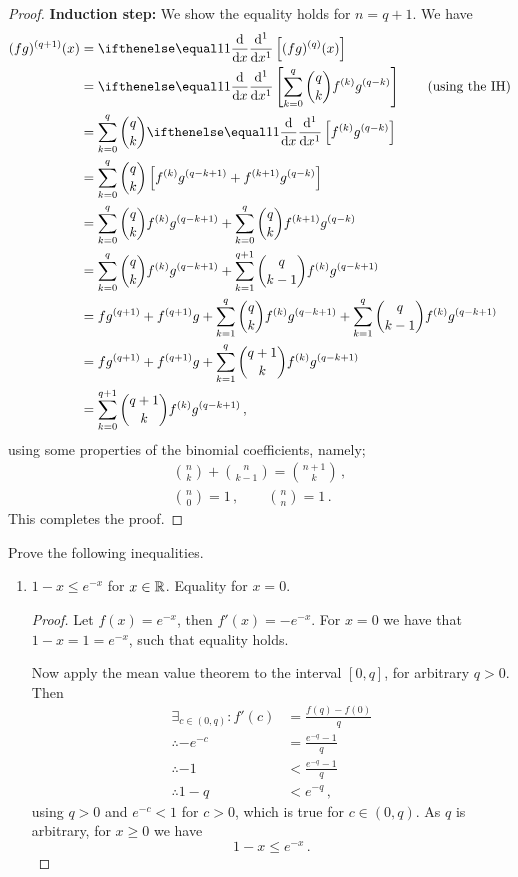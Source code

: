 \documentclass[week=6]{homework}
\begin{document}
\begin{questions}
\begin{proof}
	    	\textbf{Induction step:}
	    	We show the equality holds for $n=q+1$. We have
	    	\begin{align*}
		    	(fg)^{(q+1)}(x) &= \diff{}\left[ (fg)^{(q)}(x) \right] \\
		    	&= \diff{} \left[ \sum_{k=0}^{q} {q\choose k} f^{(k)}g^{(q-k)} \right] \qquad \mbox{(using the IH)} \\
		    	&= \sum_{k=0}^{q} {q\choose k} \diff{} \left[ f^{(k)}g^{(q-k)} \right] \\
		    	&= \sum_{k=0}^{q} {q\choose k} \left[f^{(k)}g^{(q-k+1)} + f^{(k+1)}g^{(q-k)}\right] \\
		    	&= \sum_{k=0}^{q} {q\choose k} f^{(k)}g^{(q-k+1)} + \sum_{k=0}^{q} {q\choose k} f^{(k+1)}g^{(q-k)} \\
		    	&= \sum_{k=0}^{q} {q\choose k} f^{(k)}g^{(q-k+1)} + \sum_{k=1}^{q+1} {q\choose k-1} f^{(k)}g^{(q-k+1)} \\
		    	&= fg^{(q+1)} + f^{(q+1)}g + \sum_{k=1}^{q} {q\choose k} f^{(k)}g^{(q-k+1)} + \sum_{k=1}^{q} {q\choose k-1} f^{(k)}g^{(q-k+1)} \\
		    	&= fg^{(q+1)} + f^{(q+1)}g + \sum_{k=1}^{q} {q+ 1 \choose k} f^{(k)}g^{(q-k+1)} \\
		    	&= \sum_{k=0}^{q+1} {q+ 1 \choose k} f^{(k)}g^{(q-k+1)}\,,
	    	\end{align*}
	    	using some properties of the binomial coefficients, namely;
	    	\begin{gather*}
	    		{n \choose k} + {n \choose k-1} = {n+1 \choose k} \,, \\
	    		{n \choose 0} = 1 \,, \qquad {n \choose n} = 1\,.
	    	\end{gather*}
	    	This completes the proof.
	    \end{proof}
	    
	    \question
	    Prove the following inequalities.
	    \begin{enumerate}[label=(\alph*)]
	    	\addtocounter{enumi}{2}
	    	\item
	    	\begin{inlinetoprove}
	    		$ \displaystyle 1-x \leq e^{-x}$ for $x \in \mathbb{R}$. Equality for $x=0$.
	    	\end{inlinetoprove}
	    	\begin{proof}
	    		Let $f(x) = e^{-x}$, then $f'(x) = -e^{-x}$. For $x=0$ we have that $1-x = 1 = e^{-x}$, such that equality holds.
	    		
	    		Now apply the mean value theorem to the interval $[0,q]$, for arbitrary $q>0$. Then
	    		\begin{align*}
	    			\exists_{c \in (0,q)}: f'(c) &= \frac{f(q)-f(0)}{q} \\
	    			\therefore -e^{-c} &= \frac{e^{-q} - 1}{q} \\
	    			\therefore -1 &< \frac{e^{-q} - 1}{q} \\
	    			\therefore 1-q &< e^{-q}\,,
	    		\end{align*}
	    		using $q > 0$ and $e^{-c} < 1$ for $c > 0$, which is true for $c \in (0,q)$. As $q$ is arbitrary, for $x \geq 0$ we have
	    		\[
		    		 1-x \leq e^{-x}\,.
	    		\]
	    		

\end{proof}
\end{enumerate}
\end{questions}
\end{document}
